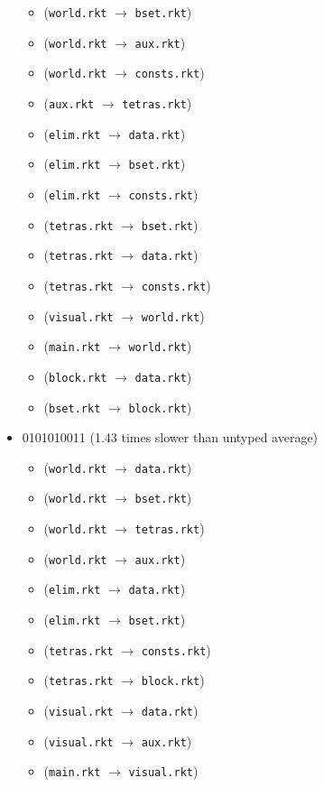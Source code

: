 \documentclass{article}
\newcommand{\mono}[1]{\texttt{#1}}
\begin{document}
\begin{itemize}
\begin{itemize}
  \item (\mono{world.rkt} $\rightarrow$ \mono{bset.rkt})
  \item (\mono{world.rkt} $\rightarrow$ \mono{aux.rkt})
  \item (\mono{world.rkt} $\rightarrow$ \mono{consts.rkt})
  \item (\mono{aux.rkt} $\rightarrow$ \mono{tetras.rkt})
  \item (\mono{elim.rkt} $\rightarrow$ \mono{data.rkt})
  \item (\mono{elim.rkt} $\rightarrow$ \mono{bset.rkt})
  \item (\mono{elim.rkt} $\rightarrow$ \mono{consts.rkt})
  \item (\mono{tetras.rkt} $\rightarrow$ \mono{bset.rkt})
  \item (\mono{tetras.rkt} $\rightarrow$ \mono{data.rkt})
  \item (\mono{tetras.rkt} $\rightarrow$ \mono{consts.rkt})
  \item (\mono{visual.rkt} $\rightarrow$ \mono{world.rkt})
  \item (\mono{main.rkt} $\rightarrow$ \mono{world.rkt})
  \item (\mono{block.rkt} $\rightarrow$ \mono{data.rkt})
  \item (\mono{bset.rkt} $\rightarrow$ \mono{block.rkt})
  \end{itemize}
\item 0101010011 (1.43 times slower than untyped average)
  \begin{itemize}
  \item (\mono{world.rkt} $\rightarrow$ \mono{data.rkt})
  \item (\mono{world.rkt} $\rightarrow$ \mono{bset.rkt})
  \item (\mono{world.rkt} $\rightarrow$ \mono{tetras.rkt})
  \item (\mono{world.rkt} $\rightarrow$ \mono{aux.rkt})
  \item (\mono{elim.rkt} $\rightarrow$ \mono{data.rkt})
  \item (\mono{elim.rkt} $\rightarrow$ \mono{bset.rkt})
  \item (\mono{tetras.rkt} $\rightarrow$ \mono{consts.rkt})
  \item (\mono{tetras.rkt} $\rightarrow$ \mono{block.rkt})
  \item (\mono{visual.rkt} $\rightarrow$ \mono{data.rkt})
  \item (\mono{visual.rkt} $\rightarrow$ \mono{aux.rkt})
  \item (\mono{main.rkt} $\rightarrow$ \mono{visual.rkt})

\end{itemize}
\end{itemize}
\end{document}
